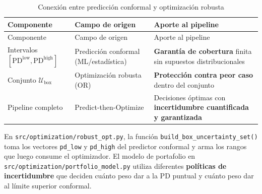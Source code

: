 \documentclass[
  spanish,
  11pt,
  letterpaper,
]{scrbook}
\theoremstyle{plain}
\theoremstyle{remark}
\begin{document}
\begin{longtable}[]{@{}
  >{\raggedright\arraybackslash}p{}
  >{\raggedright\arraybackslash}p{}
  >{\raggedright\arraybackslash}p{}@{}}
\caption{Conexión entre predicción conformal y optimización
robusta}\label{tbl-conformal-robust-connection}\tabularnewline
\toprule\noalign{}
\begin{minipage}[b]{\linewidth}\raggedright
Componente
\end{minipage} & \begin{minipage}[b]{\linewidth}\raggedright
Campo de origen
\end{minipage} & \begin{minipage}[b]{\linewidth}\raggedright
Aporte al pipeline
\end{minipage} \\
\midrule\noalign{}
\endfirsthead
\toprule\noalign{}
\begin{minipage}[b]{\linewidth}\raggedright
Componente
\end{minipage} & \begin{minipage}[b]{\linewidth}\raggedright
Campo de origen
\end{minipage} & \begin{minipage}[b]{\linewidth}\raggedright
Aporte al pipeline
\end{minipage} \\
\midrule\noalign{}
\endhead
\bottomrule\noalign{}
\endlastfoot
Intervalos \([\text{PD}^{\text{low}}, \text{PD}^{\text{high}}]\) &
Predicción conformal (ML/estadística) & \textbf{Garantía de cobertura}
finita sin supuestos distribucionales \\
Conjunto \(\mathcal{U}_{\text{box}}\) & Optimización robusta (OR) &
\textbf{Protección contra peor caso} dentro del conjunto \\
Pipeline completo & Predict-then-Optimize & Decisiones óptimas con
\textbf{incertidumbre cuantificada y garantizada} \\
\end{longtable}

\begin{tcolorbox}[enhanced jigsaw, arc=.35mm, bottomrule=.15mm, bottomtitle=1mm, breakable, colback=white, colbacktitle=quarto-callout-note-color!10!white, colframe=quarto-callout-note-color-frame, coltitle=black, left=2mm, leftrule=.75mm, opacityback=0, opacitybacktitle=0.6, rightrule=.15mm, title=\textcolor{quarto-callout-note-color}{\faInfo}\hspace{0.5em}{Implementación en el proyecto}, titlerule=0mm, toprule=.15mm, toptitle=1mm]

En \texttt{src/optimization/robust\_opt.py}, la función
\texttt{build\_box\_uncertainty\_set()} toma los vectores
\texttt{pd\_low} y \texttt{pd\_high} del predictor conformal y arma los
rangos que luego consume el optimizador. El modelo de portafolio en
\texttt{src/optimization/portfolio\_model.py} utiliza diferentes
\textbf{políticas de incertidumbre} que deciden cuánto peso dar a la PD
puntual y cuánto peso dar al límite superior conformal.

\end{tcolorbox}
\end{document}
